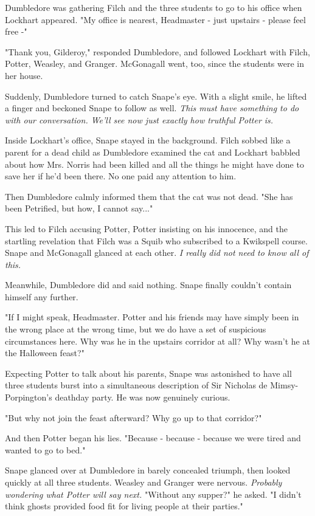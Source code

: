\documentclass[a4paper,11pt]{article}
\begin{document}
Dumbledore was gathering Filch and the three students to go to his office when Lockhart appeared. "My office is nearest, Headmaster - just upstairs - please feel free -"

"Thank you, Gilderoy," responded Dumbledore, and followed Lockhart with Filch, Potter, Weasley, and Granger. McGonagall went, too, since the students were in her house.

Suddenly, Dumbledore turned to catch Snape's eye. With a slight smile, he lifted a finger and beckoned Snape to follow as well. \emph{This must have something to do with our conversation. We'll see now just exactly how truthful Potter is.}

Inside Lockhart's office, Snape stayed in the background. Filch sobbed like a parent for a dead child as Dumbledore examined the cat and Lockhart babbled about how Mrs. Norris had been killed and all the things he might have done to save her if he'd been there. No one paid any attention to him.

Then Dumbledore calmly informed them that the cat was not dead. "She has been Petrified, but how, I cannot say..."

This led to Filch accusing Potter, Potter insisting on his innocence, and the startling revelation that Filch was a Squib who subscribed to a Kwikspell course. Snape and McGonagall glanced at each other. \emph{I really did not need to know all of this.}

Meanwhile, Dumbledore did and said nothing. Snape finally couldn't contain himself any further.

"If I might speak, Headmaster. Potter and his friends may have simply been in the wrong place at the wrong time, but we do have a set of suspicious circumstances here. Why was he in the upstairs corridor at all? Why wasn't he at the Halloween feast?"

Expecting Potter to talk about his parents, Snape was astonished to have all three students burst into a simultaneous description of Sir Nicholas de Mimsy-Porpington's deathday party. He was now genuinely curious.

"But why not join the feast afterward? Why go up to that corridor?"

And then Potter began his lies. "Because - because - because we were tired and wanted to go to bed."

Snape glanced over at Dumbledore in barely concealed triumph, then looked quickly at all three students. Weasley and Granger were nervous. \emph{Probably wondering what Potter will say next.} "Without any supper?" he asked. "I didn't think ghosts provided food fit for living people at their parties."
\end{document}
